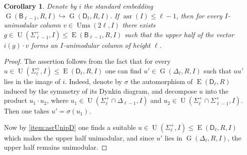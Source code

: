 \documentclass[11pt]{amsart}
\theoremstyle{plain}
\numberwithin{equation}{section}
\numberwithin{lemma}{section}
\newtheorem{cor}[lemma]{Corollary}
\theoremstyle{definition}
\theoremstyle{remark}
\DeclareMathOperator{\G}{G}
\DeclareMathOperator{\E}{E}
\DeclareMathOperator{\U}{U}
\DeclareMathOperator{\asr}{asr}
\DeclareMathOperator{\Ums}{Ums}
\newcommand{\rB}{\mathsf{B}}
\newcommand{\rD}{\mathsf{D}}
\begin{document}
\begin{cor} \label{cor:embeddingBD}
 Denote by $i$ the standard embedding $\G(\rB_{\ell-1}, R, I) \hookrightarrow \G(\rD_\ell, R, I)$. 
 If $\asr(I) \leqslant \ell-1$, then for every $I$-unimodular column $v \in \Ums(2\ell, I)$ there exists $g \in \U(\Sigma_{\ell-1}^+, I) \leqslant \E(\rB_{\ell-1}, R, I)$ such that
 the upper half of the vector $i(g) \cdot v$ forms an $I$-unimodular column of height $\ell$.
\end{cor}
\begin{proof}
 The assertion follows from the fact that for every $u \in \U(\Sigma_\ell^+, I) \leqslant \E(\rD_\ell, R, I)$ one can find $u' \in \G(\Delta_\ell, R, I)$ such that $uu'$ lies in the image of $i$. 
 Indeed, denote by $\sigma$ the automorphism of $\E(\rD_\ell, R)$ induced by the symmetry of its Dynkin diagram, and decompose $u$ into the product $u_1 \cdot u_2$, where $u_1 \in \U(\Sigma_\ell^+\cap\Delta_{\ell-1}, I)$ and $u_2 \in \U(\Sigma_\ell^+ \cap \Sigma_{\ell-1}^+, I)$.
 Then one takes $u' = \sigma(u_1)$.

 Now by \cref{item:asrUnipD} one finds a suitable $u \in \U(\Sigma_\ell^+, I) \leqslant \E(\rD_\ell, R, I)$ which makes the upper half unimodular,
 and since $u'$ lies in $\G(\Delta_\ell, R, I)$, the upper half remains unimodular.
\end{proof}
\end{document}
